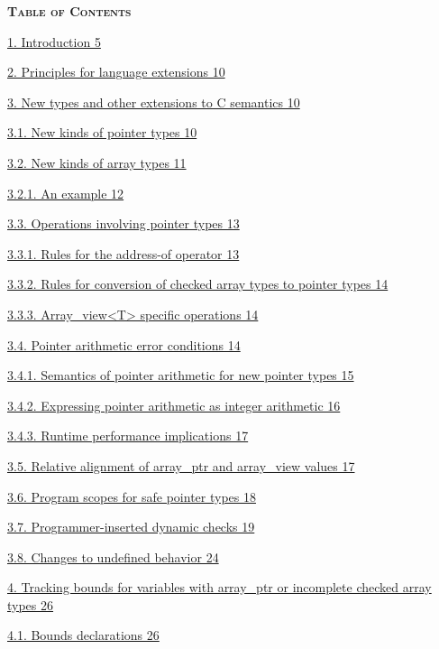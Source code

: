 \documentclass[]{article}
\begin{document}
\textbf{\textsc{Table of Contents}}

\protect\hyperlink{ux5fToc440551839}{1. Introduction 5}

\protect\hyperlink{ux5fToc440551840}{2. Principles for language
extensions 10}

\protect\hyperlink{ux5fToc440551841}{3. New types and other extensions
to C semantics 10}

\protect\hyperlink{ux5fToc440551842}{3.1. New kinds of pointer types 10}

\protect\hyperlink{ux5fToc440551843}{3.2. New kinds of array types 11}

\protect\hyperlink{ux5fToc440551844}{3.2.1. An example 12}

\protect\hyperlink{ux5fToc440551845}{3.3. Operations involving pointer
types 13}

\protect\hyperlink{ux5fToc440551846}{3.3.1. Rules for the address-of
operator 13}

\protect\hyperlink{ux5fToc440551847}{3.3.2. Rules for conversion of
checked array types to pointer types 14}

\protect\hyperlink{ux5fToc440551848}{3.3.3.
Array\_view\textless{}T\textgreater{} specific operations 14}

\protect\hyperlink{ux5fToc440551849}{3.4. Pointer arithmetic error
conditions 14}

\protect\hyperlink{ux5fToc440551850}{3.4.1. Semantics of pointer
arithmetic for new pointer types 15}

\protect\hyperlink{ux5fToc440551851}{3.4.2. Expressing pointer
arithmetic as integer arithmetic 16}

\protect\hyperlink{ux5fToc440551852}{3.4.3. Runtime performance
implications 17}

\protect\hyperlink{ux5fToc440551853}{3.5. Relative alignment of
array\_ptr and array\_view values 17}

\protect\hyperlink{ux5fToc440551854}{3.6. Program scopes for safe
pointer types 18}

\protect\hyperlink{ux5fToc440551855}{3.7. Programmer-inserted dynamic
checks 19}

\protect\hyperlink{ux5fToc440551856}{3.8. Changes to undefined behavior
24}

\protect\hyperlink{ux5fToc440551857}{4. Tracking bounds for variables
with array\_ptr or incomplete checked array types 26}

\protect\hyperlink{ux5fToc440551858}{4.1. Bounds declarations 26}
\end{document}

